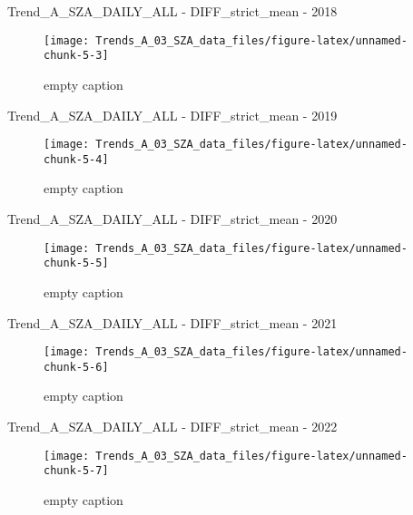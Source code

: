 \documentclass[
  10pt,
  a4paper,oneside]{article}
\begin{document}
Trend\_A\_SZA\_DAILY\_ALL - DIFF\_strict\_mean - 2018

\begin{figure}[!ht]

{\centering \texttt{[image: Trends\_A\_03\_SZA\_data\_files/figure-latex/unnamed-chunk-5-3]} 

}

\caption{ empty caption }\label{fig:unnamed-chunk-5-3}
\end{figure}

Trend\_A\_SZA\_DAILY\_ALL - DIFF\_strict\_mean - 2019

\begin{figure}[!ht]

{\centering \texttt{[image: Trends\_A\_03\_SZA\_data\_files/figure-latex/unnamed-chunk-5-4]} 

}

\caption{ empty caption }\label{fig:unnamed-chunk-5-4}
\end{figure}

Trend\_A\_SZA\_DAILY\_ALL - DIFF\_strict\_mean - 2020

\begin{figure}[!ht]

{\centering \texttt{[image: Trends\_A\_03\_SZA\_data\_files/figure-latex/unnamed-chunk-5-5]} 

}

\caption{ empty caption }\label{fig:unnamed-chunk-5-5}
\end{figure}

Trend\_A\_SZA\_DAILY\_ALL - DIFF\_strict\_mean - 2021

\begin{figure}[!ht]

{\centering \texttt{[image: Trends\_A\_03\_SZA\_data\_files/figure-latex/unnamed-chunk-5-6]} 

}

\caption{ empty caption }\label{fig:unnamed-chunk-5-6}
\end{figure}

Trend\_A\_SZA\_DAILY\_ALL - DIFF\_strict\_mean - 2022

\begin{figure}[!ht]

{\centering \texttt{[image: Trends\_A\_03\_SZA\_data\_files/figure-latex/unnamed-chunk-5-7]} 

}

\caption{ empty caption }\label{fig:unnamed-chunk-5-7}
\end{figure}
\end{document}
